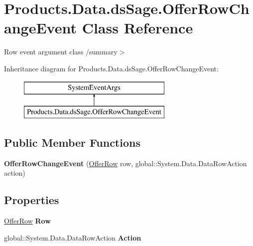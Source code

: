 \hypertarget{class_products_1_1_data_1_1ds_sage_1_1_offer_row_change_event}{}\section{Products.\+Data.\+ds\+Sage.\+Offer\+Row\+Change\+Event Class Reference}
\label{class_products_1_1_data_1_1ds_sage_1_1_offer_row_change_event}


Row event argument class /summary$>$  


Inheritance diagram for Products.\+Data.\+ds\+Sage.\+Offer\+Row\+Change\+Event\+:\begin{figure}[H]
\begin{center}
\leavevmode
\includegraphics[height=2.000000cm]{class_products_1_1_data_1_1ds_sage_1_1_offer_row_change_event}
\end{center}
\end{figure}
\subsection*{Public Member Functions}
\begin{DoxyCompactItemize}
\item 
{\bfseries Offer\+Row\+Change\+Event} (\hyperlink{class_products_1_1_data_1_1ds_sage_1_1_offer_row}{Offer\+Row} row, global\+::\+System.\+Data.\+Data\+Row\+Action action)\hypertarget{class_products_1_1_data_1_1ds_sage_1_1_offer_row_change_event_a1c75712a0785ba8ee7d763acce9b5e60}{}\label{class_products_1_1_data_1_1ds_sage_1_1_offer_row_change_event_a1c75712a0785ba8ee7d763acce9b5e60}

\end{DoxyCompactItemize}
\subsection*{Properties}
\begin{DoxyCompactItemize}
\item 
\hyperlink{class_products_1_1_data_1_1ds_sage_1_1_offer_row}{Offer\+Row} {\bfseries Row}\hypertarget{class_products_1_1_data_1_1ds_sage_1_1_offer_row_change_event_a62dc4970b506fcaa7c19018878d53a50}{}\label{class_products_1_1_data_1_1ds_sage_1_1_offer_row_change_event_a62dc4970b506fcaa7c19018878d53a50}

\item 
global\+::\+System.\+Data.\+Data\+Row\+Action {\bfseries Action}\hypertarget{class_products_1_1_data_1_1ds_sage_1_1_offer_row_change_event_acd21df75cf5bd26422eb314118f49805}{}\label{class_products_1_1_data_1_1ds_sage_1_1_offer_row_change_event_acd21df75cf5bd26422eb314118f49805}

\end{DoxyCompactItemize}


